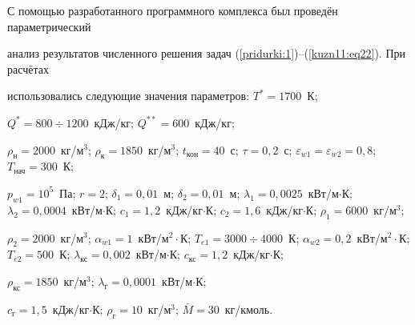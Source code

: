 С помощью разработанного программного комплекса был проведён параметрический

анализ результатов численного решения задач (\ref{pridurki:1})--(\ref{kuzn11:eq22}). При расчётах

использовались следующие значения параметров:  $T^\ast =1700$~К;

$Q^\ast =800\div 1200$~кДж/кг; $Q^{\ast \ast }=600$~кДж/кг; 

$\rho_\text{н} =2000$~кг/м$^{3}$; $\rho_\text{к} =1850$~кг/м$^{3}$; $t_{\text{кон}} =40$~с; $\tau

=0,2$~с; $\varepsilon_{w1} =\varepsilon _{w2} =0,8$; $T_{\text{нач}} =300$~К;

$p_{w1} =10^5$~Па; $r=2$; $\delta _1 =0,01$~м; $\delta _2 =0,01$~м; $\lambda

_1 =0,0025$~кВт/м$\cdot $К; $\lambda_2 =0,0004$~кВт/м$\cdot $К; $c_1 =1,2$~кДж/кг$\cdot $К; $c_2 =1,6$~кДж/кг$\cdot $К; $\rho _1 =6000$~кг/м$^{3}$;

$\rho _2 =2000$~кг/м$^{3}$; $\alpha _{w1} =1$~кВт/м$^{2}\cdot $К; $T_{e1}

=3000\div 4000$~К; $\alpha _{w2} =0,2$~кВт/м$^{2}\cdot $К; $T_{e2} =500$~К; $\lambda _\text{кс} =0,002$~кВт/м$\cdot $К; $c_\text{кс} =1,2$~кДж/кг$\cdot $К;

$\rho_\text{кс} =1850$~кг/м$^{3}$; $\lambda_\text{г} =0,0001$~кВт/м$\cdot $К;

$c_\text{г} =1,5$~кДж/кг$\cdot $К; $\rho_\text{г} =10$~кг/м$^{3}$; $\bar

{M}=30$~кг/кмоль.



